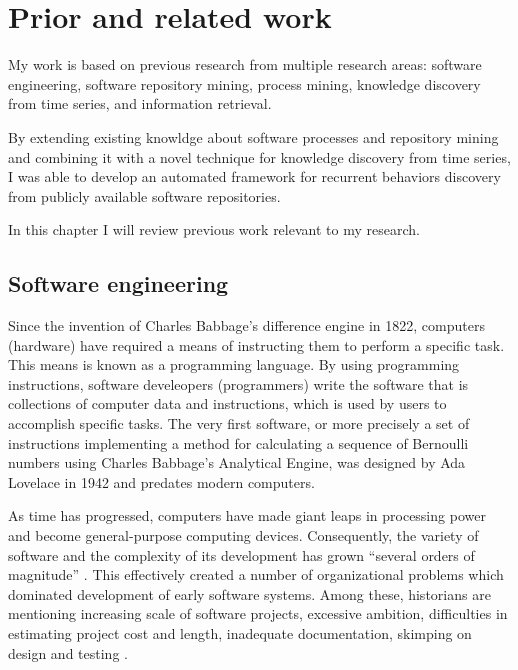 \chapter{Prior and related work}
My work is based on previous research from multiple research areas: software engineering, 
software repository mining, process mining, knowledge discovery from time series,
and information retrieval. 

By extending existing knowldge about software processes and repository mining and combining 
it with a novel technique for knowledge discovery from time series, 
I was able to develop an automated framework for recurrent behaviors discovery from publicly 
available software repositories.

In this chapter I will review previous work relevant to my research.

\section{Software engineering}
Since the invention of Charles Babbage’s difference engine in 1822, computers (hardware) 
have required a means of instructing them to perform a specific task. This means is known 
as a programming language. By using programming instructions, software develeopers (programmers)
write the software that is collections of computer data and instructions, which is used by 
users to accomplish specific tasks. The very first software, or more precisely a set of 
instructions implementing a method for calculating a sequence of Bernoulli numbers using 
Charles Babbage's Analytical Engine, was designed by Ada Lovelace in 1942 and predates modern 
computers. 

As time has progressed, computers have made giant leaps in processing power and become 
general-purpose computing devices. Consequently, the variety of software and 
the complexity of its development has grown ``several orders of magnitude'' \cite{naur_crisis_68}. 
This effectively created a number of organizational problems which dominated development of 
early software systems. Among these, historians are mentioning increasing scale of software projects, 
excessive ambition, difficulties in estimating project cost and length, inadequate documentation, 
skimping on design and testing \cite{mahoney_roots_1990} \cite{citeulike:12748733} 
\cite{citeulike:833903}.

